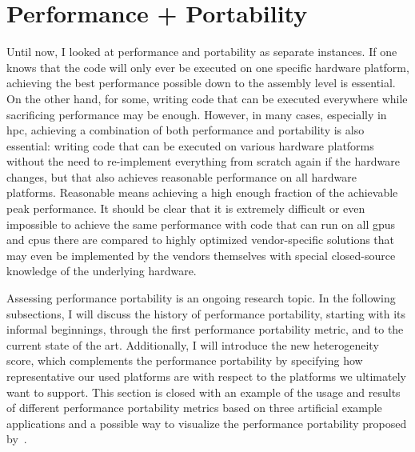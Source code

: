 \section{Performance + Portability}
\label{sec:pp}

Until now, I looked at performance and portability as separate instances. 
If one knows that the code will only ever be executed on one specific hardware platform, achieving the best performance possible down to the assembly level is essential. 
On the other hand, for some, writing code that can be executed everywhere while sacrificing performance may be enough. 
However, in many cases, especially in \gls{hpc}, achieving a combination of both performance and portability is also essential: writing code that can be executed on various hardware platforms without the need to re-implement everything from scratch again if the hardware changes, but that also achieves reasonable performance on all hardware platforms. 
Reasonable means achieving a high enough fraction of the achievable peak performance. 
It should be clear that it is extremely difficult or even impossible to achieve the same performance with code that can run on all \glspl{gpu} and \glspl{cpu} there are compared to highly optimized vendor-specific solutions that may even be implemented by the vendors themselves with special closed-source knowledge of the underlying hardware. 

Assessing performance portability is an ongoing research topic. 
In the following subsections, I will discuss the history of performance portability, starting with its informal beginnings, through the first performance portability metric, and to the current state of the art. 
Additionally, I will introduce the new heterogeneity score, which complements the performance portability by specifying how representative our used platforms are with respect to the platforms we ultimately want to support. 
This section is closed with an example of the usage and results of different performance portability metrics based on three artificial example applications and a possible way to visualize the performance portability proposed by~\citet{sewall_interpreting_2020}.










